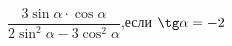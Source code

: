\begin{ex}[type=simplify_calculate]
	\begin{condition}
		\( \dfrac{3\sin\alpha\cdot\cos\alpha}{2\sin^2\alpha-3\cos^2\alpha} \),\quad если \( \tg\alpha=-2 \)
	\end{condition}
\end{ex}
